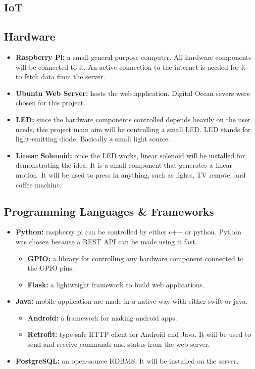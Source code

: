 \documentclass[a4paper, 12pt, oneside]{book}
\newcommand\boldcolor[1]{\textcolor{bold}{\textbf{#1}}}
\begin{document}
			\subsection{IoT}
			\subsection{Hardware}
				\begin{itemize}
				\item \boldcolor{Raspberry Pi:} a small general purpose computer. All hardware components will be connected to it. An active connection to the internet is needed for it to fetch data from the server. %
				\item \boldcolor{Ubuntu Web Server:} hosts the web application. Digital Ocean severs were chosen for this project.
				
				\item \boldcolor{LED:} since the hardware components controlled depends heavily on the user needs, this project main aim will be controlling a small LED. LED stands for light-emitting diode. Basically a small light source. %
				\item \boldcolor{Linear Solenoid:} once the LED works, linear solenoid will be installed for demonstrating the idea. It is a small component that generates a linear motion. It will be used to press in anything, such as lights, TV remote, and coffee machine. %
				\end{itemize}
				
			\subsection{Programming Languages \& Frameworks}
				\begin{itemize}
					
					\item \boldcolor{Python:} raspberry pi can be controlled by either c++ or python. Python was chosen because a REST API can be made using it fast.
		 				\begin{itemize}
		 					\item \boldcolor{GPIO:} a library for controlling any hardware component connected to the GPIO pins.
		 					\item \boldcolor{Flask:} a lightweight framework to build web applications.
						\end{itemize}
					\item \boldcolor{Java:} mobile application are made in a native way with either swift or java.
						\begin{itemize}
							\item \boldcolor{Android:} a framework for making android apps.
							\item \boldcolor{Retrofit:} type-safe HTTP client for Android and Java. It will be used to send and receive commands and status from the web server.
							
						\end{itemize}
					\item \boldcolor{PostgreSQL:} an open-source RDBMS. It will be installed on the server.
				\end{itemize}
			
\end{document}
